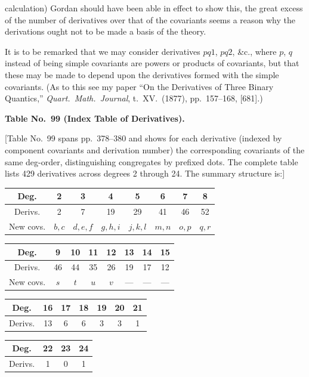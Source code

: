 \documentclass[11pt,a4paper]{book}
\begin{document}
calculation) Gordan should have been able in effect to show this, the great excess of the number of derivatives over that of the covariants seems a reason why the derivations ought not to be made a basis of the theory.

It is to be remarked that we may consider derivatives $p q 1$, $p q 2$, \&c., where $p$, $q$ instead of being simple covariants are powers or products of covariants, but that these may be made to depend upon the derivatives formed with the simple covariants. (As to this see my paper ``On the Derivatives of Three Binary Quantics,'' \textit{Quart.\ Math.\ Journal}, t.~XV.\ (1877), pp.~157--168, [681].)

\bigskip

\noindent\textbf{Table No.~99 (Index Table of Derivatives).}

\medskip

[Table No.~99 spans pp.\ 378--380 and shows for each derivative (indexed by component covariants and derivation number) the corresponding covariants of the same deg-order, distinguishing congregates by prefixed dots. The complete table lists 429 derivatives across degrees 2 through 24. The summary structure is:]

\begin{center}
\begin{tabular}{c|ccccccc}
Deg. & 2 & 3 & 4 & 5 & 6 & 7 & 8 \\[2pt]
\hline
Derivs. & 2 & 7 & 19 & 29 & 41 & 46 & 52 \\
\hline
New covs. & $b, c$ & $d, e, f$ & $g, h, i$ & $j, k, l$ & $m, n$ & $o, p$ & $q, r$ \\
\end{tabular}
\end{center}
\begin{center}
\begin{tabular}{c|ccccccc}
Deg. & 9 & 10 & 11 & 12 & 13 & 14 & 15 \\[2pt]
\hline
Derivs. & 46 & 44 & 35 & 26 & 19 & 17 & 12 \\
\hline
New covs. & $s$ & $t$ & $u$ & $v$ & --- & --- & --- \\
\end{tabular}
\end{center}
\begin{center}
\begin{tabular}{c|cccccc}
Deg. & 16 & 17 & 18 & 19 & 20 & 21 \\[2pt]
\hline
Derivs. & 13 & 6 & 6 & 3 & 3 & 1 \\
\end{tabular}
\end{center}
\begin{center}
\begin{tabular}{c|ccc}
Deg. & 22 & 23 & 24 \\[2pt]
\hline
Derivs. & 1 & 0 & 1 \\
\end{tabular}
\end{center}
\end{document}
